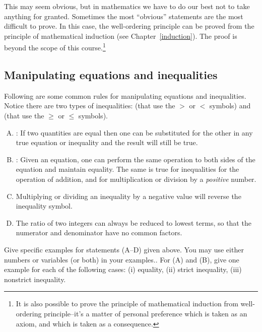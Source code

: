 \noindent
This may seem obvious, but in mathematics we have to do our best not to take anything for granted.  Sometimes the most ``obvious'' statements are the most difficult to prove. In this case, the well-ordering principle can be proved from the principle of mathematical induction (see Chapter~\ref{induction}). The proof is beyond the scope of this course.\footnote{It is also possible to prove the principle of mathematical induction from well-ordering principle--it's a matter of personal preference which is taken as an axiom, and which is taken as a consequence.}


\subsection {Manipulating equations and inequalities}\label{subsec:eqsAndIneqs}

Following are some common rules for manipulating equations and inequalities. Notice there are two types of inequalities:   (that use the $>$ or $<$ symbols) and  (that use the $\ge$ or $\le$ symbols). 

\begin{enumerate}[(A)]
\item
{}: If two quantities are equal then one can be substituted for the other in any true equation or inequality and the result will still be true. 
\item
{}: Given an equation, one can perform the same operation to both sides of the equation and maintain equality.  The same is true for inequalities for the operation of addition, and for multiplication or division by a \emph{positive} number.
\item
{}
Multiplying or dividing an inequality by a negative value will reverse the inequality symbol.
\item
{}
The ratio of two integers can always be reduced to lowest terms, so that the numerator and denominator have no common factors.
\end {enumerate}

\begin{exercise}{4}
Give specific examples for statements (A--D)   given above. You may use either numbers or variables (or both) in your examples.. For (A) and (B), give one example for each of the following cases: (i) equality, (ii) strict inequality, (iii) nonstrict inequality.
\end{exercise}


